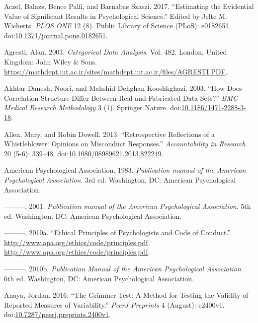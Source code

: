 \documentclass[a5paper]{book}
\begin{document}
\hypertarget{ref-doi:10.1371ux2fjournal.pone.0182651}{}
Aczel, Balazs, Bence Palfi, and Barnabas Szaszi. 2017. ``Estimating the
Evidential Value of Significant Results in Psychological Science.''
Edited by Jelte M. Wicherts. \emph{PLOS ONE} 12 (8). Public Library of
Science (PLoS): e0182651.
doi:\href{https://doi.org/10.1371/journal.pone.0182651}{10.1371/journal.pone.0182651}.

\hypertarget{ref-isbn:0471360937}{}
Agresti, Alan. 2003. \emph{Categorical Data Analysis}. Vol. 482. London,
United Kingdom: John Wiley \& Sons.
\url{https://mathdept.iut.ac.ir/sites/mathdept.iut.ac.ir/files/AGRESTI.PDF}.

\hypertarget{ref-doi:10.1186ux2f1471-2288-3-18}{}
Akhtar-Danesh, Noori, and Mahshid Dehghan-Kooshkghazi. 2003. ``How Does
Correlation Structure Differ Between Real and Fabricated Data-Sets?''
\emph{BMC Medical Research Methodology} 3 (1). Springer Nature.
doi:\href{https://doi.org/10.1186/1471-2288-3-18}{10.1186/1471-2288-3-18}.

\hypertarget{ref-doi:10.1080ux2f08989621.2013.822249}{}
Allen, Mary, and Robin Dowell. 2013. ``Retrospective Reflections of a
Whistleblower: Opinions on Misconduct Responses.'' \emph{Accountability
in Research} 20 (5-6): 339--48.
doi:\href{https://doi.org/10.1080/08989621.2013.822249}{10.1080/08989621.2013.822249}.

\hypertarget{ref-American_Psychological_Association1983-yf}{}
American Psychological Association. 1983. \emph{Publication manual of
the American Psychological Association}. 3rd ed. Washington, DC:
American Psychological Association.

\hypertarget{ref-American_Psychological_Association2001-uw}{}
---------. 2001. \emph{Publication manual of the American Psychological
Association}. 5th ed. Washington, DC: American Psychological
Association.

\hypertarget{ref-apa2010}{}
---------. 2010a. ``Ethical Principles of Psychologists and Code of
Conduct.'' \url{http://www.apa.org/ethics/code/principles.pdf}.
\url{http://www.apa.org/ethics/code/principles.pdf}.

\hypertarget{ref-isbn:9781433805615}{}
---------. 2010b. \emph{Publication Manual of the American Psychological
Association}. 6th ed. Washington, DC: American Psychological
Association.

\hypertarget{ref-doi:10.7287ux2fpeerj.preprints.2400v1}{}
Anaya, Jordan. 2016. ``The Grimmer Test: A Method for Testing the
Validity of Reported Measures of Variability.'' \emph{PeerJ Preprints} 4
(August): e2400v1.
doi:\href{https://doi.org/10.7287/peerj.preprints.2400v1}{10.7287/peerj.preprints.2400v1}.
\end{document}
